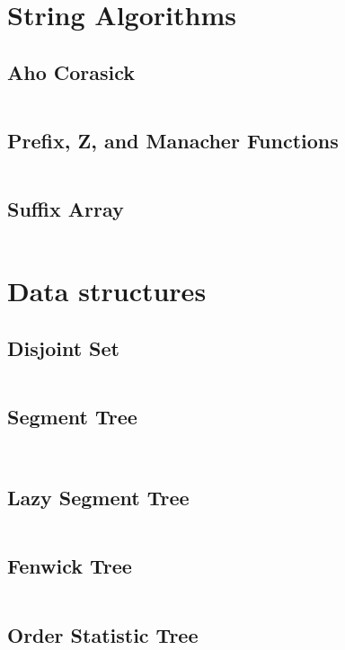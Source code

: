 \documentclass[letterpaper,landscape]{article}
\begin{document}
\begin{multicols*}{2}
  \section{String Algorithms}
  \subsection{Aho Corasick}
  \inputminted{java}{src/Strings/AhoCorasick.java}
  
  \subsection{Prefix, Z, and Manacher Functions}
  \inputminted{java}{src/Strings/Strings.java}
  
  \subsection{Suffix Array}
  \inputminted{java}{src/Strings/SuffixArray.java}
  
  \section{Data structures}
  
  \subsection{Disjoint Set}
  \inputminted{java}{src/DS/DisjointSet.java}
  
  \subsection{Segment Tree}
  \inputminted{java}{src/DS/SegmentTree.java}
  \inputminted{cpp}{src/DS/SegmentTree.cpp}
  
  \subsection{Lazy Segment Tree}
  \inputminted{cpp}{src/DS/LazySegTree.cpp}
  
  \subsection{Fenwick Tree}
  \inputminted{cpp}{src/DS/FenwickTree.cpp}
  
  \subsection{Order Statistic Tree}
  \inputminted{cpp}{src/DS/OrderStatisticTree.cpp}
  

\end{multicols*}
\end{document}
